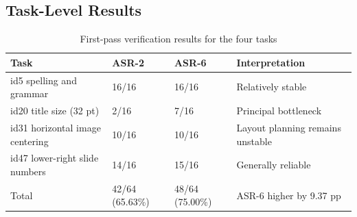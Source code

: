 \documentclass[11pt,a4paper,UTF8,fontset=fandol]{ctexart}
\begin{document}
\subsection{Task-Level Results}

\begin{table}[H]
\centering
\caption{First-pass verification results for the four tasks}
\small
\begin{tabularx}{\textwidth}{L{4.4cm} C{2.6cm} C{2.6cm} Y}
\toprule
Task & ASR-2 & ASR-6 & Interpretation \\
\midrule
id5 spelling and grammar & 16/16 & 16/16 & Relatively stable \\
id20 title size (32 pt) & 2/16 & 7/16 & Principal bottleneck \\
id31 horizontal image centering & 10/16 & 10/16 & Layout planning remains unstable \\
id47 lower-right slide numbers & 14/16 & 15/16 & Generally reliable \\
Total & 42/64 (65.63\%) & 48/64 (75.00\%) & ASR-6 higher by 9.37 pp \\
\bottomrule
\end{tabularx}
\end{table}
\end{document}
